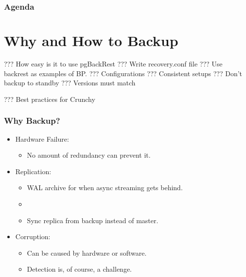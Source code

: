 %
\def\mytitle{Backup Best Practices (Draft)}
\def\mysubject{}
\def\myevent{}
\def\myauthor{David Steele}
\def\myemail{}
\def\mydate{November 16, 2017}

\def\mysuppressnav{}

\def\mytemplatepath{/template/}


\begin{frame}
    \frametitle{Agenda}
    \tableofcontents
\end{frame}

\section{Why and How to Backup}

??? How easy is it to use pgBackRest
??? Write recovery.conf file
??? Use backrest as examples of BP.
??? Configurations
??? Consistent setups
??? Don't backup to standby
??? Versions must match

??? Best practices for Crunchy

\begin{frame}
    \frametitle{Why Backup?}

    \begin{itemize}
        \item Hardware Failure:

        \begin{itemize}
            \item No amount of redundancy can prevent it.\pause
        \end{itemize}

        \item Replication:

        \begin{itemize}
            \item WAL archive for when async streaming gets behind.\pause
            \item
            \item Sync replica from backup instead of master.\pause
        \end{itemize}

        \item Corruption:

        \begin{itemize}
            \item Can be caused by hardware or software.\pause
            \item Detection is, of course, a challenge.
        \end{itemize}
    \end{itemize}
\end{frame}

